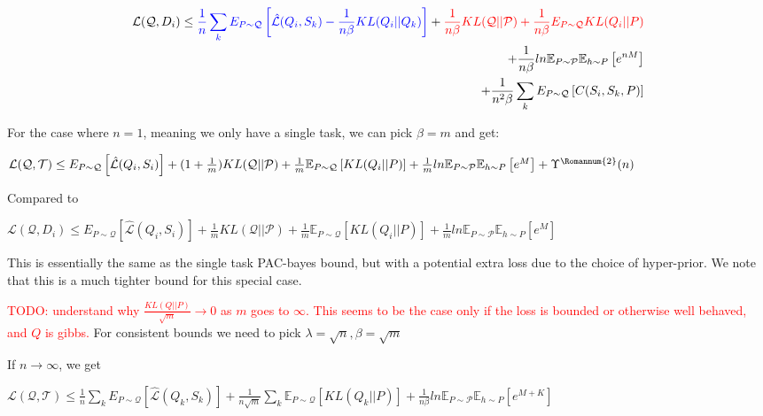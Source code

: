 \documentclass[letterpaper]{article}
\theoremstyle{definition}
\begin{document}
\begin{equation*}
\begin{split}
\mathcal{L}(\mathcal{Q}, D_i)\leq \textcolor{blue}{\frac{1}{n}\sum_k E_{P\sim \mathcal{Q}} \left [ \hat{\mathcal{L}}(Q_i,S_k) -\frac{1}{n\beta}KL(Q_i||Q_k) \right ]} + \textcolor{red}{\frac{1}{n\beta} KL(\mathcal{Q}||\mathcal{P}) +\frac{1}{n\beta}E_{P\sim \mathcal{Q}} KL(Q_i||P)} \\+ \frac{1}{n\beta} ln\mathbb{E}_{P\sim \mathcal{P}}\mathbb{E}_{h\sim P}\left [ e^{nM} \right ]
\\ 
+ \frac{1}{n^2\beta}\sum_k E_{P\sim \mathcal{Q}} \left [C(S_i,S_k,P)\right ]
\end{split}
\end{equation*}

For the case where $n=1$, meaning we only have a single task, we can pick $\beta=m$ and get:

$\mathcal{L}(\mathcal{Q}, \mathcal{T}) \leq  E_{P\sim \mathcal{Q}}  \left [ \hat{\mathcal{L}}(Q_i,S_i) \right ] + (1+\frac{1}{m})KL(\mathcal{Q}||\mathcal{P}) + \frac{1}{m}\mathbb{E}_{P\sim \mathcal{Q}} \left [KL(Q_i||P)\right ] + \frac{1}{m} ln\mathbb{E}_{P\sim \mathcal{P}}\mathbb{E}_{h\sim P}\left [ e^{M} \right ] + \Upsilon^{\text{\Romannum{2}}}(n)$

Compared to 


$\mathcal{L}(\mathcal{Q}, D_i)\leq E_{P\sim \mathcal{Q}}  \left [ \hat{\mathcal{L}}(Q_i,S_i) \right ] + \frac{1}{m}KL(\mathcal{Q}||\mathcal{P}) + \frac{1}{m}\mathbb{E}_{P\sim \mathcal{Q}} \left [KL(Q_i||P)\right ] + \frac{1}{m} ln\mathbb{E}_{P\sim \mathcal{P}}\mathbb{E}_{h\sim P}\left [ e^{M} \right ] $

This is essentially the same as the single task PAC-bayes bound, but with a potential extra loss due to the choice of hyper-prior. We note that this is a much tighter bound for this special case.

\textcolor{red}{TODO: understand why $\frac{KL(Q||P)}{\sqrt{m}}\rightarrow 0$ as $m$ goes to $\infty$. This seems to be the case only if the loss is bounded or otherwise well behaved, and $Q$ is gibbs. }
For consistent bounds we need to pick $\lambda=\sqrt{n}, \beta=\sqrt{m}$

If $n\rightarrow\infty$, we get 

$\mathcal{L}(\mathcal{Q}, \mathcal{T}) \leq \frac{1}{n}\sum_k E_{P\sim \mathcal{Q}} \left [ \hat{\mathcal{L}}(Q_k,S_k) \right ] + \frac{1}{n\sqrt{m}}\sum_k \mathbb{E}_{P\sim \mathcal{Q}} \left [KL(Q_k||P) \right ] + \frac{1}{n\beta} ln\mathbb{E}_{P\sim \mathcal{P}}\mathbb{E}_{h\sim P}\left [ e^{M+K} \right ]$
\end{document}
